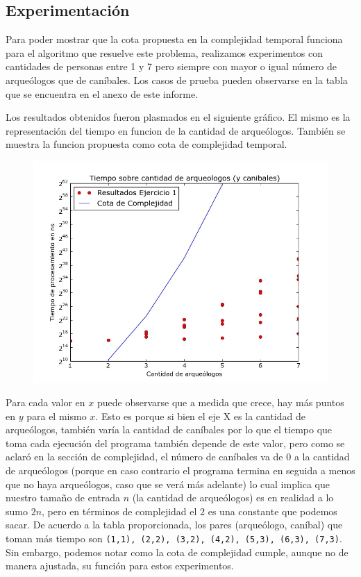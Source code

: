     \subsection{Experimentación}

	Para poder mostrar que la cota propuesta en la complejidad temporal funciona para el algoritmo que resuelve este problema, realizamos experimentos con cantidades de personas entre 1 y 7 pero siempre con mayor o igual número de arqueólogos que de caníbales. Los casos de prueba pueden observarse en la tabla que se encuentra en el anexo de este informe.

  Los resultados obtenidos fueron plasmados en el siguiente gráfico. El mismo es la representación del tiempo en funcion de la cantidad de arqueólogos. También se muestra la funcion propuesta como cota de complejidad temporal.

  \begin{figure}[H]
      \begin{center}
        \includegraphics[width=0.7\columnwidth]{imagenes/exp1Ej1-1a7.jpeg}
        \caption{}
      \end{center}
  \end{figure}

  Para cada valor en $x$ puede observarse que a medida que crece, hay más puntos en $y$ para el mismo $x$. Esto es porque si bien el eje X es la cantidad de arqueólogos, también varía la cantidad de caníbales por lo que el tiempo que toma cada ejecución del programa también depende de este valor, pero como se aclaró en la sección de complejidad, el número de caníbales va de 0 a la cantidad de arqueólogos (porque en caso contrario el programa termina en seguida a menos que no haya arqueólogos, caso que se verá más adelante) lo cual implica que nuestro tamaño de entrada $n$ (la cantidad de arqueólogos) es en realidad a lo sumo $2n$, pero en términos de complejidad el $2$ es una constante que podemos sacar.
  De acuerdo a la tabla proporcionada, los pares (arqueólogo, caníbal) que toman más tiempo son \texttt{(1,1), (2,2), (3,2), (4,2), (5,3), (6,3), (7,3)}. Sin embargo, podemos notar como la cota de complejidad cumple, aunque no de manera ajustada, su función para estos experimentos.


